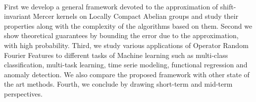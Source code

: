 \paragraph{}
First we develop a general framework devoted to the approximation of
shift-invariant Mercer kernels on Locally Compact Abelian groups and study
their properties along with the complexity of the algorithms based on them.
Second we show theoretical guarantees by bounding the error due to the
approximation, with high probability. Third, we study various applications of
Operator Random Fourier Features to different tasks of Machine learning such as
multi-class classification, multi-task learning, time serie modeling,
functional regression and anomaly detection. We also compare the proposed
framework with other state of the art methods. Fourth, we conclude by drawing
short-term and mid-term perspectives.

\endgroup

\vfill
